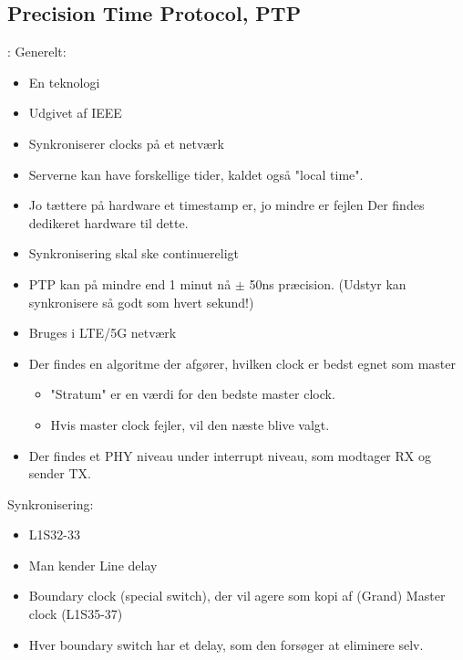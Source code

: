 \documentclass[oneside, 10pt]{article}
\begin{document}
\subsection{Precision Time Protocol, PTP}:
Generelt:
\begin{itemize}
	\item En teknologi
	\item Udgivet af IEEE
	\item Synkroniserer clocks på et netværk
	\item Serverne kan have forskellige tider, kaldet også "local time".
	\item Jo tættere på hardware et timestamp er, jo mindre er fejlen
	\subitem Der findes dedikeret hardware til dette.
	\item Synkronisering skal ske continuereligt
	\item PTP kan på mindre end 1 minut nå $\pm$ 50ns præcision. (Udstyr kan synkronisere så godt som hvert sekund!)
	\item Bruges i LTE/5G netværk
	\item Der findes en algoritme der afgører, hvilken clock er bedst egnet som master
	\begin{itemize}
	 	\item "Stratum" er en værdi for den bedste master clock.
	 	\item Hvis master clock fejler, vil den næste blive valgt.
	 \end{itemize} 
	 \item Der findes et PHY niveau under interrupt niveau, som modtager RX og sender TX.
\end{itemize}

Synkronisering:
\begin{itemize}
	\item L1S32-33
	\item Man kender Line delay
	\item Boundary clock (special switch), der vil agere som kopi af (Grand) Master clock (L1S35-37)
	\item Hver boundary switch har et delay, som den forsøger at eliminere selv.
\end{itemize}
\end{document}
